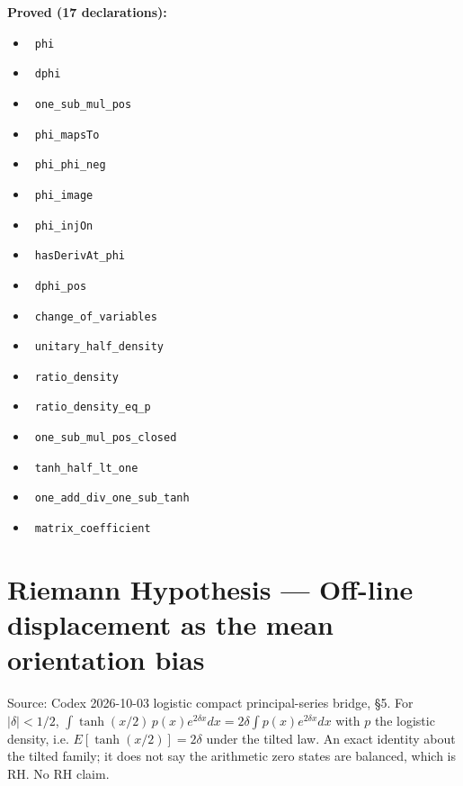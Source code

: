 \documentclass{report}
\theoremstyle{definition}
\begin{document}
\noindent\textbf{Proved (17 declarations):}
\begin{itemize}
  \item {}\leanok\ \texttt{phi}
  \item {}\leanok\ \texttt{dphi}
  \item {}\leanok\ \texttt{one\_sub\_mul\_pos}
  \item {}\leanok\ \texttt{phi\_mapsTo}
  \item {}\leanok\ \texttt{phi\_phi\_neg}
  \item {}\leanok\ \texttt{phi\_image}
  \item {}\leanok\ \texttt{phi\_injOn}
  \item {}\leanok\ \texttt{hasDerivAt\_phi}
  \item {}\leanok\ \texttt{dphi\_pos}
  \item {}\leanok\ \texttt{change\_of\_variables}
  \item {}\leanok\ \texttt{unitary\_half\_density}
  \item {}\leanok\ \texttt{ratio\_density}
  \item {}\leanok\ \texttt{ratio\_density\_eq\_p}
  \item {}\leanok\ \texttt{one\_sub\_mul\_pos\_closed}
  \item {}\leanok\ \texttt{tanh\_half\_lt\_one}
  \item {}\leanok\ \texttt{one\_add\_div\_one\_sub\_tanh}
  \item {}\leanok\ \texttt{matrix\_coefficient}
\end{itemize}

\section{Riemann Hypothesis --- Off-line displacement as the mean orientation bias}
Source: Codex 2026-10-03 logistic compact principal-series bridge, §5. For $|\delta|<1/2$, $\int\tanh(x/2)\,p(x)e^{2\delta x}dx=2\delta\int p(x)e^{2\delta x}dx$ with $p$ the logistic density, i.e. $E[\tanh(x/2)]=2\delta$ under the tilted law. An exact identity about the tilted family; it does not say the arithmetic zero states are balanced, which is RH. No RH claim.
\end{document}
